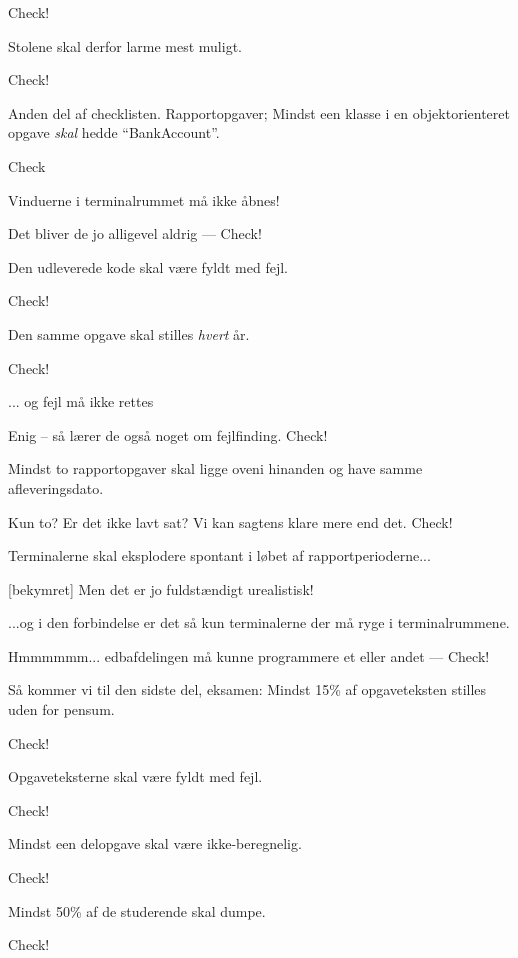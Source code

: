 \documentclass[danish]{article}
\begin{document}
\begin{sketch}
 Check!

 Stolene skal derfor larme mest muligt.

 Check!

 Anden del af checklisten. Rapportopgaver; Mindst een klasse
i en objektorienteret opgave \emph{skal} hedde ``BankAccount''.

 Check

 Vinduerne i terminalrummet må ikke åbnes!

 Det bliver de jo alligevel aldrig --- Check!

 Den udleverede kode skal være fyldt med fejl.

 Check!

 Den samme opgave skal stilles \emph{hvert} år.

 Check!

 ... og fejl må ikke rettes 

 Enig -- så lærer de også noget om fejlfinding. Check!

 Mindst to rapportopgaver skal ligge oveni hinanden og have
samme afleveringsdato.

 Kun to? Er det ikke lavt sat? Vi kan sagtens klare mere
end det. Check!

 Terminalerne skal eksplodere spontant i løbet af
rapportperioderne...

[bekymret] Men det er jo fuldstændigt urealistisk!

 ...og i den forbindelse er det så kun terminalerne der må
ryge i terminalrummene.

 Hmmmmmm... edbafdelingen må kunne programmere et eller andet --- Check!

 Så kommer vi til den sidste del, eksamen: Mindst 15\% af
opgaveteksten stilles uden for pensum. 

 Check!

 Opgaveteksterne skal være fyldt med fejl.

 Check!

 Mindst een delopgave skal være ikke-beregnelig.

 Check!

 Mindst 50\% af de studerende skal dumpe.

 Check!


\end{sketch}
\end{document}
